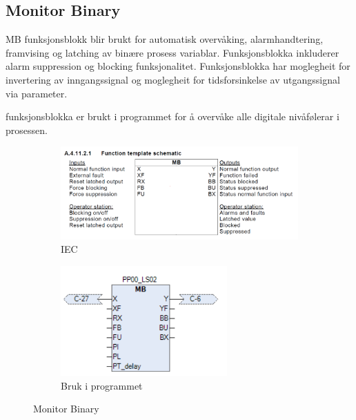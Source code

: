 \subsection{Monitor Binary}

\gls{MB} funksjonsblokk blir brukt for automatisk overvåking, alarmhandtering, framvising og latching av binære prosess variablar.
Funksjonsblokka inkluderer alarm suppression og blocking funksjonalitet. Funksjonsblokka har moglegheit for invertering av 
inngangssignal og moglegheit for tidsforsinkelse av utgangssignal via parameter.

funksjonsblokka er brukt i programmet for å overvåke alle digitale nivåfølerar i prosessen.

\begin{figure}[htbp]
    \centering
    \begin{subfigure}[b]{0.45\textwidth}
        \centering
        \includegraphics[width=1\textwidth]{Bilder/MBBlokkIEC.png}
        \caption{IEC}\label{fig:Monitor Binary blokk IEC}
    \end{subfigure}
    \hfill
    \begin{subfigure}[b]{0.45\textwidth}
        \centering
        \includegraphics[width=0.7\textwidth]{Bilder/MBBlokkIProgrammet.png}
        \caption{Bruk i programmet}\label{fig:Monitor Binary blokk i programmet}
    \end{subfigure}
    \caption{Monitor Binary}\label{fig:Monitor Binary}
\end{figure}

